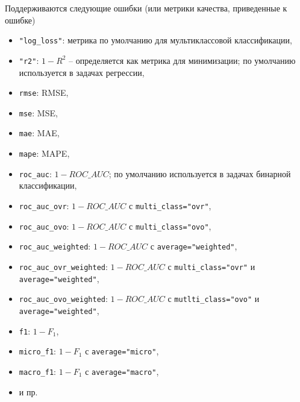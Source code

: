 \documentclass[%
	11pt,
	a4paper,
	utf8,
		]{article}
\begin{document}
Поддерживаются следующие ошибки (или метрики качества, приведенные к ошибке)
\begin{itemize}
	\item \verb|"log_loss"|: метрика по умолчанию для мультиклассовой классификации,
	
	\item \verb|"r2"|: $ 1 - R^2 $ -- определяется как метрика для минимизации; по умолчанию используется в задачах регрессии,
	
	\item \verb|rmse|: RMSE,
	
	\item \verb|mse|: MSE,
	
	\item \verb|mae|: MAE,
	
	\item \verb|mape|: MAPE,
	
	\item \verb|roc_auc|: $ 1 - ROC\_AUC $; по умолчанию используется в задачах бинарной классификации,
	
	\item \verb|roc_auc_ovr|: $ 1 - ROC\_AUC $ с \verb|multi_class="ovr"|,
	
	\item \verb|roc_auc_ovo|: $ 1 - ROC\_AUC $ с \verb|multi_class="ovo"|,
	
	\item \verb|roc_auc_weighted|: $ 1 - ROC\_AUC $ с \verb|average="weighted"|,
	
	\item \verb|roc_auc_ovr_weighted|: $ 1 - ROC\_AUC $ с \verb|multi_class="ovr"| и \verb|average="weighted"|,
	
	\item \verb|roc_auc_ovo_weighted|: $ 1 - ROC\_AUC $ с \verb|mutlti_class="ovo"| и \verb|average="weighted"|,
	
	\item \verb|f1|: $ 1 - F_1 $,
	
	\item \verb|micro_f1|: $ 1 - F_1 $ с \verb|average="micro"|,
	
	\item \verb|macro_f1|: $ 1 - F_1 $ с \verb|average="macro"|,
	
	\item и пр.
\end{itemize}
\end{document}
